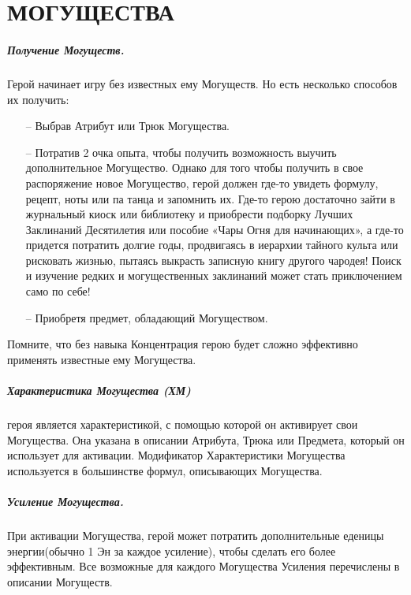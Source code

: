 \chapter{МОГУЩЕСТВА}

\paragraph{Получение Могуществ.} Герой начинает игру без известных ему Могуществ. Но есть несколько способов их получить:
\begin{itemize}
\item[--] Выбрав Атрибут или Трюк Могущества.
\item[--] Потратив 2 очка опыта, чтобы получить возможность выучить дополнительное Могущество.
\newline
Однако для того чтобы получить в свое распоряжение новое Могущество, герой должен где-то увидеть формулу, рецепт, ноты или па танца и запомнить их. Где-то герою достаточно зайти в журнальный киоск или библиотеку и приобрести подборку Лучших Заклинаний Десятилетия или пособие «Чары Огня для начинающих», а где-то придется потратить долгие годы, продвигаясь в иерархии тайного культа или рисковать жизнью, пытаясь выкрасть записную книгу другого чародея! Поиск и изучение редких и могущественных заклинаний может стать приключением само по себе!
\item[--] Приобретя предмет, обладающий Могуществом.
\end{itemize}
\begin{tcolorbox}
Помните, что без навыка Концентрация герою будет сложно эффективно применять известные ему Могущества.
\end{tcolorbox}
\paragraph{Характеристика Могущества (ХМ)} героя является характеристикой, с помощью которой он активирует свои Могущества. Она указана в описании Атрибута, Трюка или Предмета, который он использует для активации. Модификатор Характеристики Могущества используется в большинстве формул, описывающих Могущества.
\paragraph{Усиление Могущества.} При активации Могущества, герой может потратить дополнительные еденицы энергии(обычно 1 Эн за каждое усиление), чтобы сделать его более эффективным. Все возможные для каждого Могущества Усиления перечислены в описании Могуществ.
